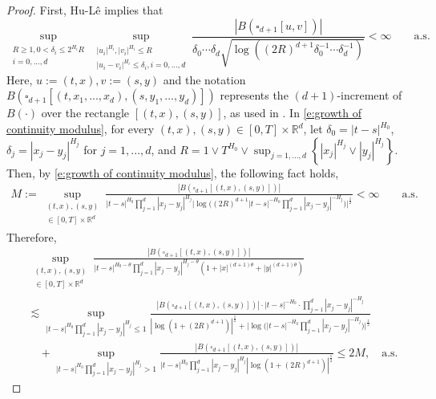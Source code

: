 \documentclass[11pt,reqno]{amsart}
\numberwithin{equation}{section}
\begin{document}
\begin{proof}
First, Hu-Lê \cite[Example~5.9]{HuLe} implies that
\begin{equation}\label{e:growth of continuity modulus}
\sup_{\substack{R\ge 1,0<\delta_{i}\le 2^{H_{i}}R\\ i=0,...,d}}\sup_{\substack{|u_{i}|^{H_{i}},|v_{i}|^{H_{i}}\le R\\|u_{i}-v_{i}|^{H_{i}}\le \delta_{i},i=0,...,d}}\frac{|B(\square_{d+1}[u,v])|}{\delta_{0}\cdots\delta_{d}\sqrt{\log((2R)^{d+1}\delta^{-1}_{0}\cdots\delta^{-1}_{d})}}<\infty\qquad \text{a.s.}
\end{equation}
Here, $u:=(t,x),v:=(s,y)$ and the notation $B(\square_{d+1}[(t,x_1,...,x_d),(s,y_1,...,y_d)])$ represents the $(d+1)$-increment of $B(\cdot)$ over the rectangle $[(t,x),(s,y)]$, as used in \cite[Section~5]{HuLe}. In \eqref{e:growth of continuity modulus}, for every $(t,x),(s,y)\in[0,T]\times \mathbb{R}^{d}$, let $\delta_{0} = |t-s|^{H_{0}}$, $\delta_{j} = |x_{j}-y_{j}|^{H_{j}}$ for $j=1,...,d$, and $R = 1\vee T^{H_{0}}\vee\sup_{j=1,...,d}\left\{|x_{j}|^{H_{j}}\vee|y_{j}|^{H_{j}}\right\}$. Then, by \eqref{e:growth of continuity modulus}, the following fact holds,
\begin{equation*}
\begin{aligned}
M:= \sup_{\substack{(t,x),(s,y)\\ \in[0,T]\times \mathbb{R}^{d}}}\frac{|B(\square_{d+1}[(t,x),(s,y)])|}{|t-s|^{H_{0}}\prod\limits_{j=1}^{d}|x_{j}-y_{j}|^{H_{j}}\Big|\log\Big((2R)^{d+1}|t-s|^{-H_{0}}\prod\limits_{j=1}^{d}|x_{j}-y_{j}|^{-H_{j}}\Big)\Big|^{\frac{1}{2}}} <\infty\qquad \text{a.s.}
\end{aligned}
\end{equation*}
Therefore,
\begin{equation}\label{eq:mult-Holder continuity}
\begin{aligned}
&\sup_{\substack{(t,x),(s,y)\\ \in[0,T]\times \mathbb{R}^{d}}}\frac{|B(\square_{d+1}[(t,x),(s,y)])|}{|t-s|^{H_{0} - \theta}\prod\limits_{j=1}^{d}|x_{j}-y_{j}|^{H_{j} - \theta}\left(1 + |x|^{(d+1)\theta} + |y|^{(d+1)\theta}\right)}\\
&\lesssim\sup_{|t-s|^{H_{0}} \prod\limits_{j=1}^{d}|x_{j}-y_{j}|^{H_{j}}\le 1}\frac{|B(\square_{d+1}[(t,x),(s,y)])|\cdot|t-s|^{-H_{0}}\cdot\prod\limits_{j=1}^{d}|x_{j}-y_{j}|^{-H_{j}}}{\left|\log\left(1 + (2R)^{d+1}\right)\right|^{\frac{1}{2}} + \Big|\log\Big(|t-s|^{-H_{0}}\prod\limits_{j=1}^{d}|x_{j}-y_{j}|^{-H_{j}}\Big)\Big|^{\frac{1}{2}}}\\
&\quad + \sup_{|t-s|^{H_{0}}\prod\limits_{j=1}^{d}|x_{j}-y_{j}|^{H_{j}} > 1}\frac{|B(\square_{d+1}[(t,x),(s,y)])|}{|t-s|^{H_{0}}\prod\limits_{j=1}^{d}|x_{j}-y_{j}|^{H_{j}}\left|\log\left(1 + (2R)^{d+1}\right)\right|^{\frac{1}{2}}}\le  2M ,\quad \text{a.s.}
\end{aligned}
\end{equation}


\end{proof}
\end{document}

